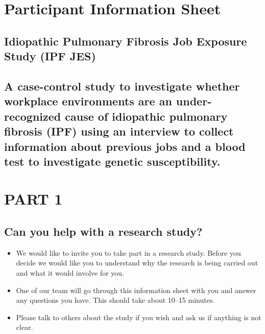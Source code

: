 \documentclass[a4paper,10pt]{article}
\date{}
\begin{document}
\pagestyle{fancy} 



\section*{Participant Information Sheet}

\subsection*{Idiopathic Pulmonary Fibrosis Job Exposure Study (IPF JES)}
\subsection*{A case-control study to investigate whether workplace environments are an under-recognized cause of idiopathic pulmonary fibrosis (IPF) using an interview to collect information about previous
jobs and a blood test to investigate genetic susceptibility.}


\section*{PART 1}
\subsection*{Can you help with a research study?}

\begin{itemize}
 \item We would like to invite you to take part in a research study. Before you decide we would like you to understand why the research is being carried out and what it would involve for you.  
 \item One of our team will go through this information sheet with you and answer any questions you have. This should take about 10--15 minutes.
 \item Please talk to others about the study if you wish and ask us if anything is not clear.
\end{itemize}
\end{document}
